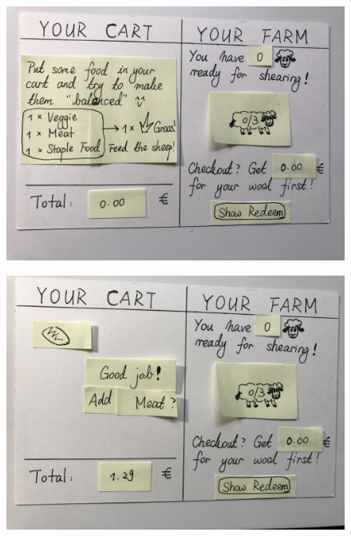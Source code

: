 \documentclass[a4paper,10pt,oneside]{scrreprt}
\begin{document}
\begin{figure}[h]
	\centering
	\includegraphics[scale=0.10, clip, trim={0em 0em 0em 0em}]{images/IMG_0565.jpg}
\end{figure}

\begin{figure}[h]
	\centering
	\includegraphics[scale=0.10, clip, trim={0em 0em 0em 0em}]{images/IMG_0566.jpg}
\end{figure}
\end{document}
